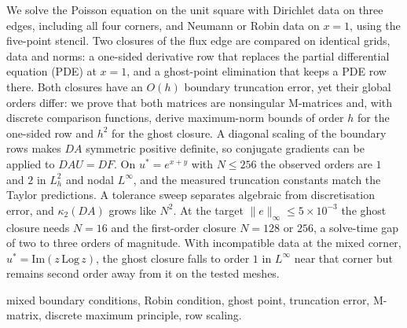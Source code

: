 \documentclass[11pt,a4paper]{article}
\newcommand{\lead}[1]{{\scshape\color{accent}#1}}   %
\theoremstyle{palplain}
\theoremstyle{paldef}
\theoremstyle{palremark}
\begin{document}
\begin{titlepage}
\begin{minipage}{\textwidth}
We solve the Poisson equation on the unit square with Dirichlet data on three edges,
including all four corners, and Neumann or Robin data on $x=1$, using the five-point stencil.
Two closures of the flux edge are compared on identical grids, data and norms: a one-sided
derivative row that replaces the partial differential equation (PDE) at $x=1$, and a
ghost-point elimination that keeps a PDE row there. Both closures have an $O(h)$ boundary
truncation error, yet their global orders differ: we prove that both matrices are nonsingular
M-matrices and, with discrete comparison functions, derive maximum-norm bounds of order $h$ for
the one-sided row and $h^2$ for the ghost closure. A diagonal scaling of the boundary rows makes
$DA$ symmetric positive definite, so conjugate gradients can be applied to $DAU=DF$. On $u^*=e^{x+y}$ with $N\le256$ the
observed orders are $1$ and $2$ in $L^2_h$ and nodal $L^\infty$, and the measured truncation
constants match the Taylor predictions. A tolerance sweep separates algebraic from
discretisation error, and $\kappa_2(DA)$ grows like $N^2$. At the target
$\|e\|_\infty\le5\times10^{-3}$ the ghost closure needs $N=16$ and the first-order closure
$N=128$ or $256$, a solve-time gap of two to three orders of magnitude. With incompatible data
at the mixed corner, $u^*=\mathrm{Im}(z\,\mathrm{Log}\,z)$, the ghost closure falls to order $1$
in $L^\infty$ near that corner but remains second order away from it on the tested meshes.

\par\vspace{2.2mm}\lead{Keywords:} mixed boundary conditions, Robin condition, ghost point,
truncation error, M-matrix, discrete maximum principle, row scaling.\par
\end{minipage}

\vfill
\noindent{\color{hairline}\rule{\textwidth}{0.4pt}}\par\vspace{2.5mm}
\vspace{1mm}
\end{titlepage}
\setcounter{page}{2}

{\hypersetup{linkcolor=ink}\tableofcontents}
\newpage


\end{document}
